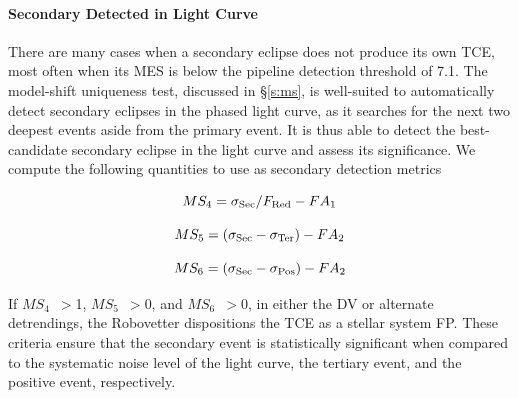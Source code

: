 \paragraph{Secondary Detected in Light Curve}
\label{secdetectsec}
\label{s:second}

There are many cases when a secondary eclipse does not produce its own TCE, most often when its MES is below the \kepler{} pipeline detection threshold of 7.1. The model-shift uniqueness test, discussed in \S\ref{s:ms}, is well-suited to automatically detect secondary eclipses in the phased light curve, as it searches for the next two deepest events aside from the primary event. It is thus able to detect the best-candidate secondary eclipse in the light curve and assess its significance. We compute the following quantities to use as secondary detection metrics

\begin{equation}
    MS_{4} = \sigma_{\rm Sec}/F_{\rm Red} - FA_{1}
\end{equation}

\begin{equation}
    MS_{5} = (\sigma_{\rm Sec} - \sigma_{\rm Ter}) - FA_{2}
\end{equation}

\begin{equation}
    MS_{6} = (\sigma_{\rm Sec} - \sigma_{\rm Pos}) - FA_{2}
\end{equation}

If $MS_{4}$~$>$1, $MS_{5}$~$>$0, and $MS_{6}$~$>$0, in either the DV or alternate detrendings, the Robovetter dispositions the TCE as a stellar system FP. These criteria ensure that the secondary event is statistically significant when compared to the systematic noise level of the light curve, the tertiary event, and the positive event, respectively.

